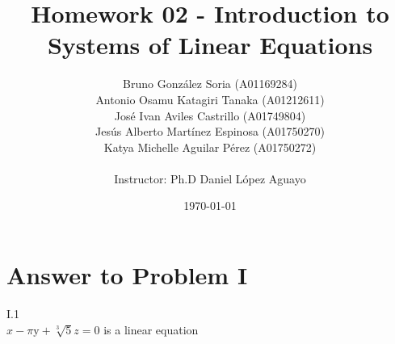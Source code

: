 \documentclass[11pt,a4paper]{article}
\title
{
    Homework 02 - Introduction to Systems of Linear Equations
}
\author
{    
    Bruno Gonz{\' a}lez Soria (A01169284)  \\
    Antonio Osamu Katagiri Tanaka (A01212611) \\
    Jos{\' e} Ivan Aviles Castrillo (A01749804) \\
    Jes{\' u}s Alberto Mart{\' i}nez Espinosa (A01750270) \\
    Katya Michelle Aguilar P{\' e}rez (A01750272) \\
    \\
    Instructor: Ph.D Daniel L{\' o}pez Aguayo
}
\date{\today}
\providecommand{\keywords}[1]
{
    \\
    \\
    \small
    \textbf{\textit{Keywords:}} #1
}
\begin{document}
\setlength\parindent{0pt} %


\maketitle


\clearpage








\section{Answer to Problem I}\label{sec:P01} %

I.1\\
\(x-\text{$\pi $y}+\sqrt[3]{5}z=0\) is a linear equation\\
\end{document}
